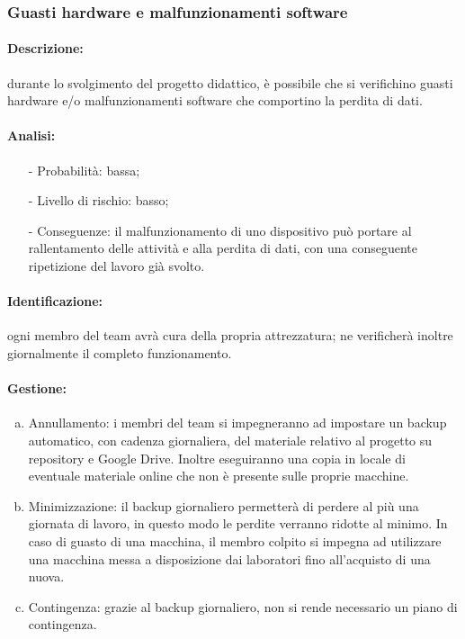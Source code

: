 \documentclass[../PianoProgetto.tex]{subfiles}
\begin{document}
	\subsubsection{Guasti hardware e malfunzionamenti software}
	
	\paragraph*{Descrizione:} durante lo svolgimento del progetto didattico, è possibile che si verifichino guasti hardware e/o malfunzionamenti software che comportino la perdita di dati.
	
	\paragraph*{Analisi:}
	\begin{itemize}
		\item[-] Probabilità: bassa;
		\item[-] Livello di rischio: basso;
		\item[-] Conseguenze: il malfunzionamento di uno dispositivo può portare al rallentamento delle attività e alla perdita di dati, con una conseguente ripetizione del lavoro già svolto.
	\end{itemize}
	
	\paragraph*{Identificazione:} ogni membro del team avrà cura della propria attrezzatura; ne verificherà inoltre giornalmente il completo funzionamento.
	
	\paragraph*{Gestione:}
	\begin{enumerate}[(a)]
		\item Annullamento: i membri del team si impegneranno ad impostare un backup automatico, con cadenza giornaliera, del materiale relativo al progetto su repository e Google Drive. Inoltre eseguiranno una copia in locale di eventuale materiale online che non è presente sulle proprie macchine.
		\item Minimizzazione: il backup giornaliero permetterà di perdere al più una giornata di lavoro, in questo modo le perdite verranno ridotte al minimo. In caso di guasto di una macchina, il membro colpito si impegna ad utilizzare una macchina messa a disposizione dai laboratori fino all'acquisto di una nuova. 
		\item Contingenza: grazie al backup giornaliero, non si rende necessario un piano di contingenza.
	\end{enumerate} 	
	
\end{document}
